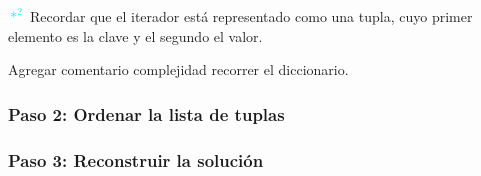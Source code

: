 \documentclass{article}
\begin{document}
\textcolor{cyan}{$*^{2}$} Recordar que el iterador está representado como una tupla, cuyo primer elemento es la clave y el segundo el valor.

Agregar comentario complejidad recorrer el diccionario.

\subsubsection*{Paso 2: Ordenar la lista de tuplas}
\subsubsection*{Paso 3: Reconstruir la solución}
\end{document}
